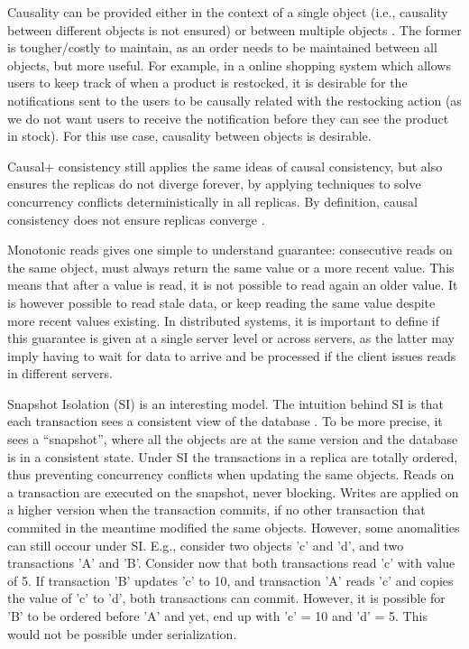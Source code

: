 
Causality can be provided either in the context of a single object (i.e., causality between different objects is not ensured) or between multiple objects \cite{understandingEC}.
The former is tougher/costly to maintain, as an order needs to be maintained between all objects, but more useful.
For example, in a online shopping system which allows users to keep track of when a product is restocked, it is desirable for the notifications sent to the users to be causally related with the restocking action (as we do not want users to receive the notification before they can see the product in stock).
For this use case, causality between objects is desirable.

Causal+ consistency \cite{cops} still applies the same ideas of causal consistency, but also ensures the replicas do not diverge forever, by applying techniques to solve concurrency conflicts deterministically in all replicas.
By definition, causal consistency does not ensure replicas converge \cite{cops}.

Monotonic reads \cite{session, understandingEC} gives one simple to understand guarantee: consecutive reads on the same object, must always return the same value or a more recent value.
This means that after a value is read, it is not possible to read again an older value.
It is however possible to read stale data, or keep reading the same value despite more recent values existing.
In distributed systems, it is important to define if this guarantee is given at a single server level or across servers, as the latter may imply having to wait for data to arrive and be processed if the client issues reads in different servers.

Snapshot Isolation (SI) is an interesting model.
The intuition behind SI is that each transaction sees a consistent view of the database \cite{si}.
To be more precise, it sees a ``snapshot'', where all the objects are at the same version and the database is in a consistent state.
Under SI the transactions in a replica are totally ordered, thus preventing concurrency conflicts when updating the same objects.
Reads on a transaction are executed on the snapshot, never blocking.
Writes are applied on a higher version when the transaction commits, if no other transaction that commited in the meantime modified the same objects.
However, some anomalities can still occour under SI.
E.g., consider two objects 'c' and 'd', and two transactions 'A' and 'B'.
Consider now that both transactions read 'c' with value of 5. 
If transaction 'B' updates 'c' to 10, and transaction 'A' reads 'c' and copies the value of 'c' to 'd', both transactions can commit.
However, it is possible for 'B' to be ordered before 'A' and yet, end up with 'c' = 10 and 'd' = 5.
This would not be possible under serialization.

